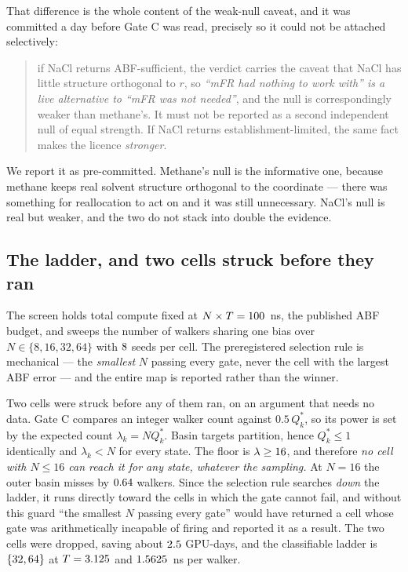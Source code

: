 That difference is the whole content of the weak-null caveat, and it was committed a day before
Gate C was read, precisely so it could not be attached selectively:

\begin{quote}
if NaCl returns ABF-sufficient, the verdict carries the caveat that NaCl has little structure
orthogonal to $r$, so \emph{``mFR had nothing to work with'' is a live alternative to ``mFR was
not needed''}, and the null is correspondingly weaker than methane's. It must not be reported as
a second independent null of equal strength. If NaCl returns establishment-limited, the same fact
makes the licence \emph{stronger}.
\end{quote}

We report it as pre-committed. Methane's null is the informative one, because methane keeps real
solvent structure orthogonal to the coordinate --- there was something for reallocation to act on
and it was still unnecessary. NaCl's null is real but weaker, and the two do not stack into
double the evidence.

\subsection{The ladder, and two cells struck before they ran}
\label{sec:nacl_ladder}

The screen holds total compute fixed at $N \times T = 100$~ns, the published ABF budget,
and sweeps the number of walkers sharing one bias over $N \in \{8, 16, 32, 64\}$ with
$8$ seeds per cell. The preregistered selection rule is mechanical --- the \emph{smallest}
$N$ passing every gate, never the cell with the largest ABF error --- and the entire map is
reported rather than the winner.

Two cells were struck before any of them ran, on an argument that needs no data. Gate C compares
an integer walker count against $0.5\,Q^*_k$, so its power is set by the expected count
$\lambda_k = N Q^*_k$. Basin targets partition, hence $Q^*_k \leq 1$ identically and
$\lambda_k < N$ for every state. The floor is $\lambda \geq 16$, and therefore
\emph{no cell with $N \leq 16$ can reach it for any state, whatever the sampling.} At $N = 16$
the outer basin misses by $0.64$ walkers. Since the selection rule searches
\emph{down} the ladder, it runs directly toward the cells in which the gate cannot fail, and
without this guard ``the smallest $N$ passing every gate'' would have returned a cell whose gate
was arithmetically incapable of firing and reported it as a result. The two cells were dropped,
saving about $2.5$ GPU-days, and the classifiable ladder is
$\{32, 64\}$ at $T = 3.125$ and $1.5625$~ns per walker.

